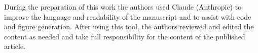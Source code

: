 During the preparation of this work the authors used Claude (Anthropic) to improve the language and readability of the manuscript and to assist with code and figure generation. After using this tool, the authors reviewed and edited the content as needed and take full responsibility for the content of the published article.
